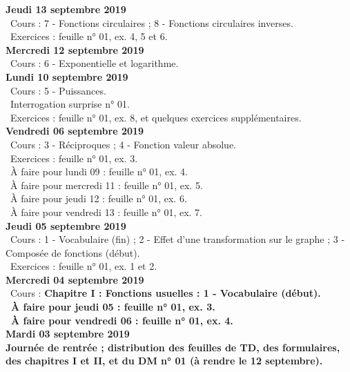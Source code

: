 \documentclass[12pt,a4paper]{article}
\begin{document}
 \noindent\textbf{\bf Jeudi 13 septembre 2019}\\
 \bu\ Cours : 7 - Fonctions circulaires ; 8 - Fonctions circulaires inverses.\\
 \bu\ Exercices : feuille n° 01, ex. 4, 5 et 6.\vspace{.4cm}\\
     
 \noindent\textbf{\bf Mercredi 12 septembre 2019}\\
 \bu\ Cours : 6 - Exponentielle et logarithme.\vspace{.4cm}\\
 
 \noindent\textbf{\bf Lundi 10 septembre 2019}\\
 \bu\ Cours : 5 - Puissances.\\
 \bu\ Interrogation surprise n° 01.\\
 \bu\ Exercices : feuille n° 01, ex. 8, et quelques exercices supplémentaires.\vspace{.4cm}\\
 
\noindent\textbf{Vendredi 06 septembre 2019}\\
\bu\ Cours : 3 - Réciproques ; 4 - Fonction valeur absolue.\\
\bu\ Exercices : feuille n° 01, ex. 3.\\
\bu\ À faire pour lundi 09 : feuille n° 01, ex. 4.\\
\bu\ À faire pour mercredi 11 : feuille n° 01, ex. 5.\\
\bu\ À faire pour jeudi 12 : feuille n° 01, ex. 6.\\
\bu\ À faire pour vendredi 13 : feuille n° 01, ex. 7.\vspace{.4cm}\\
 
\noindent\textbf{\bf Jeudi 05 septembre 2019}\\
\bu\ Cours : 1 - Vocabulaire (fin) ; 2 - Effet d'une transformation sur le graphe ; 3 - Composée de fonctions 
(début).\\
\bu\ Exercices : feuille n° 01, ex. 1 et 2.\vspace{.4cm}\\
     
\noindent\textbf{\bf Mercredi 04 septembre 2019}\\
\bu\ Cours : \bf Chapitre I \rm : Fonctions usuelles : 1 - Vocabulaire (début).\\
\bu\ À faire pour jeudi 05 : feuille n° 01, ex. 3.\\
\bu\ À faire pour vendredi 06 : feuille n° 01, ex. 4.\vspace{.4cm}\\
 

\noindent\textbf{\bf Mardi 03 septembre 2019}\\
Journée de rentrée ; distribution des feuilles de TD, des formulaires, des
chapitres I et II, et du DM n° 01 (à rendre le 12 septembre).\vspace{.4cm}\\


\label{end}
\end{document}
